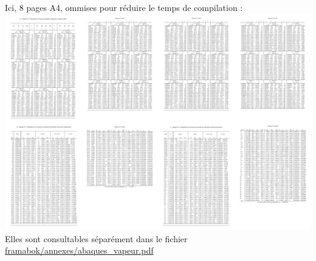 \begin{center}
	Ici, 8 pages A4, ommises pour réduire le temps de compilation :
	\includegraphics[width=\textwidth]{images/abaques.png}
	Elles sont consultables séparément dans le fichier \url{framabok/annexes/abaques_vapeur.pdf}
\end{center}
